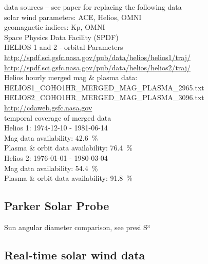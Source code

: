 


data sources -- see paper for replacing the following data\\
solar wind parameters: ACE, Helios, OMNI\\
geomagnetic indices: Kp, OMNI\\

Space Physics Data Facility (SPDF)\\

HELIOS 1 and 2 - orbital Parameters\\
\url{http://spdf.sci.gsfc.nasa.gov/pub/data/helios/helios1/traj/}\\
\url{http://spdf.sci.gsfc.nasa.gov/pub/data/helios/helios2/traj/}\\

Helios hourly merged mag \& plasma data:\\
HELIOS1\_COHO1HR\_MERGED\_MAG\_PLASMA\_2965.txt\\
HELIOS2\_COHO1HR\_MERGED\_MAG\_PLASMA\_3096.txt\\
\url{http://cdaweb.gsfc.nasa.gov}\\
temporal coverage of merged data\\
Helios 1: 1974-12-10 - 1981-06-14\\
Mag data availability: 42.6~\%\\
Plasma \& orbit data availability: 76.4~\%\\
Helios 2: 1976-01-01 - 1980-03-04\\
Mag data availability: 54.4~\%\\
Plasma \& orbit data availability: 91.8~\%\\


\subsection{Parker Solar Probe}
\label{sec:parker_solar_probe}

Sun angular diameter comparison, see presi S³\\


\subsection{Real-time solar wind data}

